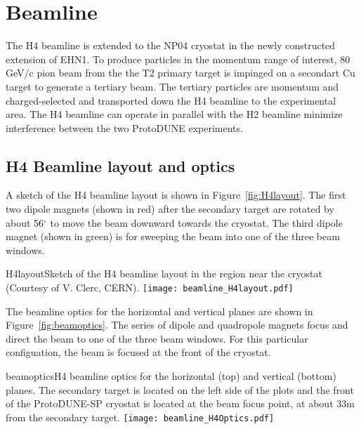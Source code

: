 \section{Beamline}
\label{sec:h4beamline}

The H4 beamline is extended to the NP04 cryostat in the newly constructed extension of EHN1. To produce particles in the momentum range of interest, 80 GeV/c pion beam from the the T2 primary target is impinged on a secondart Cu target to generate a tertiary beam. The tertiary particles are momentum and charged-selected and transported down the H4 beamline to the experimental area. The H4 beamline can operate in parallel with the H2 beamline minimize interference between the two ProtoDUNE experiments.

\subsection{H4 Beamline layout and optics}

A sketch of the H4 beamline layout is shown in Figure~\ref{fig:H4layout}. The first two dipole magnets (shown in red) after the secondary target are rotated by about 56$^\circ$ to move the beam downward towards the cryostat. The third dipole magnet (shown in green) is for sweeping the beam into one of the three beam windows.
\begin{cdrfigure}{H4layout}{Sketch of the H4 beamline layout in the region near the cryostat (Courtesy of V. Clerc, CERN).}
  \texttt{[image: beamline\_H4layout.pdf]}
\end{cdrfigure}


The beamline optics for the horizontal and vertical planes are shown in Figure~\ref{fig:beamoptics}. The series of dipole and quadropole magnets focus and direct the beam to one of the three beam windows. For this particular configuation, the beam is focused at the front of the cryostat.
\begin{cdrfigure}{beamoptics}{H4 beamline optics for the horizontal (top) and vertical (bottom) planes. The secondary target is located on the left side of the plots and the front of the ProtoDUNE-SP cryostat is located at the beam focus point, at about 33m from the secondary target.}
  \texttt{[image: beamline\_H4Optics.pdf]}
\end{cdrfigure}

